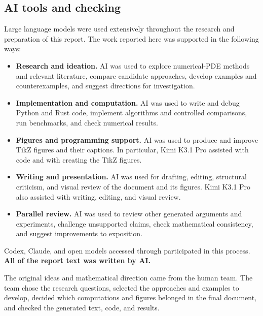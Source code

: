 \documentclass[11pt,a4paper]{article}
\begin{document}
\subsection{AI tools and checking}
Large language models were used extensively throughout the research and preparation of this report. The work reported here was supported in the following ways:
\begin{itemize}
\item \textbf{Research and ideation.} AI was used to explore numerical-PDE methods and relevant literature, compare candidate approaches, develop examples and counterexamples, and suggest directions for investigation.
\item \textbf{Implementation and computation.} AI was used to write and debug Python and Rust code, implement algorithms and controlled comparisons, run benchmarks, and check numerical results.
\item \textbf{Figures and programming support.} AI was used to produce and improve TikZ figures and their captions. In particular, Kimi K3.1 Pro assisted with code and with creating the TikZ figures.
\item \textbf{Writing and presentation.} AI was used for drafting, editing, structural criticism, and visual review of the document and its figures. Kimi K3.1 Pro also assisted with writing, editing, and visual review.
\item \textbf{Parallel review.} AI was used to review other generated arguments and experiments, challenge unsupported claims, check mathematical consistency, and suggest improvements to exposition.
\end{itemize}
Codex, Claude, and open models accessed through  participated in this process. \textbf{All of the report text was written by AI.}

The original ideas and mathematical direction came from the human team. The team chose the research questions, selected the approaches and examples to develop, decided which computations and figures belonged in the final document, and checked the generated text, code, and results.
\end{document}
